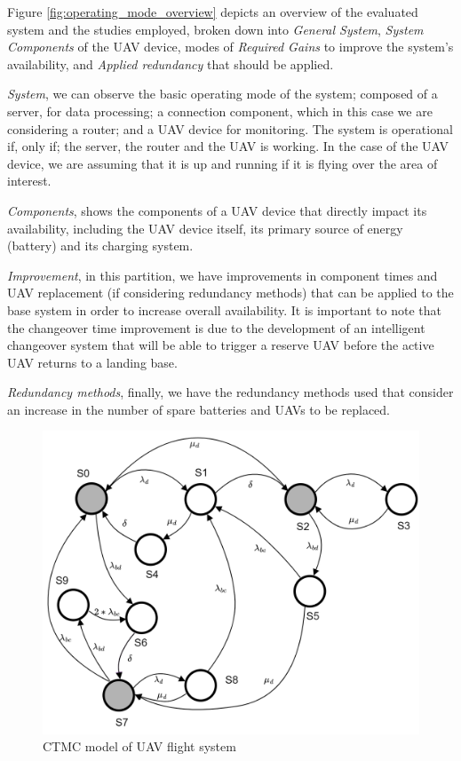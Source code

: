 \documentclass[conference]{IEEEtran}
\begin{document}
Figure \ref{fig:operating_mode_overview} depicts an overview of the evaluated system and the studies employed, broken down into \textit{General System}, \textit{System Components} of the UAV device, modes of \textit{Required Gains} to improve the system's availability, and \textit {Applied redundancy} that should be applied.

\textit{System}, we can observe the basic operating mode of the system; composed of a server, for data processing; a connection component, which in this case we are considering a router; and a UAV device for monitoring. The system is operational if, only if; the server, the router and the UAV is working. In the case of the UAV device, we are assuming that it is up and running if it is flying over the area of interest. 

\textit{Components}, shows the components of a UAV device that directly impact its availability, including the UAV device itself, its primary source of energy (battery) and its charging system.

\textit{Improvement}, in this partition, we have improvements in component times and UAV replacement (if considering redundancy methods) that can be applied to the base system in order to increase overall availability. It is important to note that the changeover time improvement is due to the development of an intelligent changeover system that will be able to trigger a reserve UAV before the active UAV returns to a landing base.  

\textit{Redundancy methods}, finally, we have the redundancy methods used that consider an increase in the number of spare batteries and UAVs to be replaced.


\begin{figure}[htbp]
\centerline{\includegraphics[scale=0.75]{img/CTMC_transparent.png}}
\caption{CTMC model of UAV flight system}
\label{fig:ctmc_model}
\end{figure}
\end{document}
